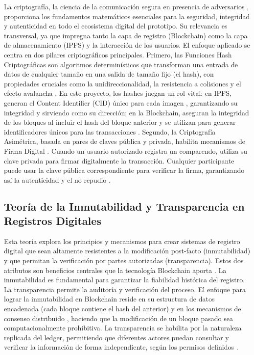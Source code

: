\documentclass[
    letterpaper, 
    man,   
    spanish,
    12pt,
    donotrepeattitle,
    floatsintext,
    hidelinks %
]{apa7}
\begin{document}
La criptografía, la ciencia de la comunicación segura en presencia de adversarios \parencite{katz2020introduction}, proporciona los fundamentos matemáticos esenciales para la seguridad, integridad y autenticidad en todo el ecosistema digital del prototipo. Su relevancia es transversal, ya que impregna tanto la capa de registro (Blockchain) como la capa de almacenamiento (IPFS) y la interacción de los usuarios. El enfoque aplicado se centra en dos pilares criptográficos principales. Primero, las Funciones Hash Criptográficas son algoritmos determinísticos que transforman una entrada de datos de cualquier tamaño en una salida de tamaño fijo (el hash), con propiedades cruciales como la unidireccionalidad, la resistencia a colisiones y el efecto avalancha \parencite{schneier2007applied,katz2020introduction}. En este proyecto, los hashes juegan un rol vital: en IPFS, generan el Content Identifier (CID) único para cada imagen \parencite{benet2014ipfs}, garantizando su integridad y sirviendo como su dirección; en la Blockchain, aseguran la integridad de los bloques al incluir el hash del bloque anterior y se utilizan para generar identificadores únicos para las transacciones \parencite{nakamoto2008bitcoin}. Segundo, la Criptografía Asimétrica, basada en pares de claves pública y privada, habilita mecanismos de Firma Digital \parencite{diffie2022new,rivest1978method}. Cuando un usuario autorizado registra un comparendo, utiliza su clave privada para firmar digitalmente la transacción. Cualquier participante puede usar la clave pública correspondiente para verificar la firma, garantizando así la autenticidad y el no repudio \parencite{katz2020introduction}. 

 

\subsection{Teoría de la Inmutabilidad y Transparencia en Registros Digitales} 

Esta teoría explora los principios y mecanismos para crear sistemas de registro digital que sean altamente resistentes a la modificación post-facto (inmutabilidad) y que permitan la verificación por partes autorizadas (transparencia). Estos dos atributos son beneficios centrales que la tecnología Blockchain aporta \parencite{swan2015blockchain,antonopoulos2023mastering}. La inmutabilidad es fundamental para garantizar la fiabilidad histórica del registro. La transparencia permite la auditoría y verificación del proceso. El enfoque para lograr la inmutabilidad en Blockchain reside en su estructura de datos encadenada (cada bloque contiene el hash del anterior) y en los mecanismos de consenso distribuido \parencite{nakamoto2008bitcoin}, haciendo que la modificación de un bloque pasado sea computacionalmente prohibitiva. La transparencia se habilita por la naturaleza replicada del ledger, permitiendo que diferentes actores puedan consultar y verificar la información de forma independiente, según los permisos definidos \parencite{antonopoulos2023mastering}. 
\end{document}
